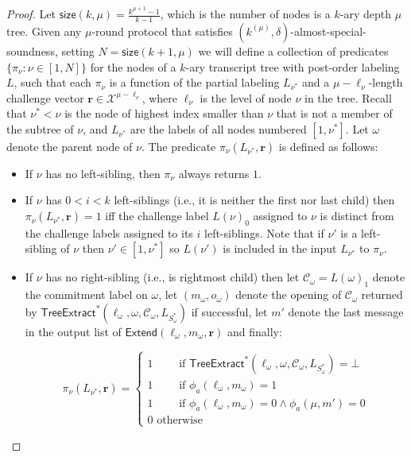 \begin{proof}
Let $\textsf{size}(k, \mu) = \frac{k^{\mu+1}-1}{k-1}$, which is the number of nodes is a $k$-ary depth $\mu$ tree. Given any $\mu$-round protocol that satisfies $(k^{(\mu)}, \delta)$-almost-special-soundness, setting $N = \textsf{size}(k+1, \mu)$ we will define a collection of predicates $\{\pi_\nu: \nu \in [1,N]\}$ for the nodes of a $k$-ary transcript tree with post-order labeling $L$, such that each $\pi_\nu$ is a function of the partial labeling $L_{\nu^*}$ and a $\mu - \ell_\nu$-length challenge vector $\mathbf{r} \in \mathcal{X}^{\mu - \ell_\nu}$, where $\ell_\nu$ is the level of node $\nu$ in the tree. Recall that $\nu^* < \nu$ is the node of highest index smaller than $\nu$ that is not a member of the subtree of $\nu$, and $L_{\nu^*}$ are the labels of all nodes numbered $[1, \nu^*]$. Let $\omega$ denote the parent node of $\nu$. The predicate $\pi_\nu(L_{\nu^*}, \mathbf{r})$ is defined as follows: 
\begin{itemize} 
\item If $\nu$ has no left-sibling, then $\pi_\nu$ always returns $1$. 
\item If $\nu$ has $0 < i < k$ left-siblings (i.e., it is neither the first nor last child) then $\pi_\nu(L_{\nu^*}, \mathbf{r}) = 1$ iff the challenge label $L(\nu)_0$ assigned to $\nu$ is distinct from the challenge labels assigned to its $i$ left-siblings. Note that if $\nu'$ is a left-sibling of $\nu$ then $\nu' \in [1, \nu^*]$ so $L(\nu')$ is included in the input $L_{\nu^*}$ to $\pi_\nu$. 
\item If $\nu$ has no right-sibling (i.e., is rightmost child) then let $\mathcal{C}_\omega = L(\omega)_1$ denote the commitment label on $\omega$, let $(m_\omega, o_\omega)$ denote the opening of $\mathcal{C}_\omega$ returned by $\textsf{TreeExtract}^*(\ell_\omega, \omega, \mathcal{C}_\omega, L_{S^*_\omega})$ if successful, let $m'$ denote the last message in the output list of $\textsf{Extend}(\ell_\omega, m_\omega,\mathbf{r})$ and finally: 

 $$\pi_\nu(L_{\nu^*}, \mathbf{r}) = 
 \begin{cases} 1 \quad\quad \text{ if }  \textsf{TreeExtract}^*(\ell_\omega, \omega, \mathcal{C}_\omega, L_{S^*_\omega}) = \bot \\ 
 1 \quad \quad \text{ if } \phi_a(\ell_\omega, m_\omega) = 1\\
 1 \quad \quad \text{ if } \phi_a(\ell_\omega, m_\omega) = 0 \wedge \phi_a(\mu, m') = 0 \\ 
0\text{ otherwise} 
\end{cases} $$ 



\end{itemize}
\end{proof}
